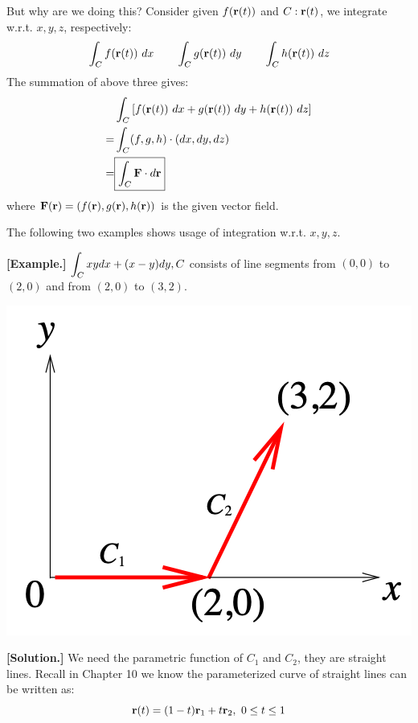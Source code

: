 \documentclass[11pt, a4paper]{MATH2023}
\newcommand{\eg}{\textbf{[Example.] }}
\newcommand{\sol}{\textbf{[Solution.] }}
\newcommand{\rr}{{\bf r}}
\newcommand{\FF}{{\bf F}}
\begin{document}
\begin{spacing}{1.3}
    \vspace{0.8in}
    But why are we doing this? Consider given $f(\rr(t))$ and $C: \rr(t)$, we integrate w.r.t. $x,y,z$, respectively: 
    $$\int_C f(\rr(t))\ dx\qquad \int_C g(\rr(t))\ dy\qquad \int_C h(\rr(t))\ dz$$
    The summation of above three gives: 
    \begin{align*}
        & \int_C \left[f(\rr(t))\ dx + g(\rr(t))\ dy + h(\rr(t))\ dz\right]\\
        =& \int_C (f, g, h) \cdot (dx, dy, dz)\\
        =& \boxed{\int_C \FF \cdot d\rr}
    \end{align*}
    where $\FF(\rr)=\left(f(\rr), g(\rr), h(\rr)\right)$ is the given vector field.


    \newpage
    {\blue The following two examples shows usage of integration w.r.t. $x, y, z$.}

    \eg $\displaystyle \int_{C} x y d x+(x-y) d y, C$ consists of line segments from $(0,0)$ to $(2,0)$ and from $(2,0)$ to $(3,2)$.
    \begin{center}
        \includegraphics[scale=0.38]{images/Ch15-wrt-eg1.png}
    \end{center}

    \sol We need the parametric function of $C_1$ and $C_2$, they are straight lines.
    Recall in Chapter 10 we know the parameterized curve of straight lines can be written as: 
    $$\rr(t)=(1-t)\rr_1+t\rr_2, \ 0\le t\le 1$$


\end{spacing}
\end{document}
